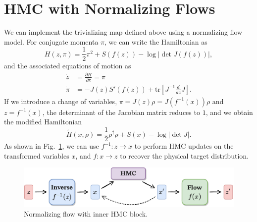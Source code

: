 \documentclass[a4paper,11pt]{article}
\begin{document}
\section{\label{sec:hmc_nf}HMC with Normalizing Flows}
%
We can implement the trivializing map defined above using a normalizing flow
model.
%
For conjugate momenta \(\pi\), we can write the Hamiltonian as
%
\begin{equation}
    H(z, \pi) = \frac{1}{2}\pi^{2} + S(f(z)) - \log\left|\det J(f(z))\right|,
\end{equation}
%
and the associated equations of motion as
%
\begin{align}
    \dot{z} &= \frac{\partial H}{\partial \pi} = \pi \\
    \dot{\pi} &= -J(z) S'(f(z)) + \mathrm{tr}\left[ J^{-1}\frac{d}{dz} J \right].
\end{align}
%
If we introduce a change of variables, \(\pi = J(z)\rho = J(f^{-1}(x))\rho\)
and \(z = f^{-1}(x)\), the determinant of the Jacobian matrix reduces to \(1\),
and we obtain the modified Hamiltonian
%
\begin{equation}
    \tilde{H}(x, \rho) = \frac{1}{2}\rho^{\dagger}\rho + S(x) - \log|\det J|.
\end{equation}
%
As shown in Fig.~\ref{fig:fthmc}, we can use \(f^{-1}: z \rightarrow x\) to
perform HMC updates on the transformed variables \(x\), and \(f: x \rightarrow
z\) to recover the physical target distribution.
%
\begin{figure}[htpb]
    \centering
    \includegraphics[width=\textwidth]{assets/fthmc.pdf}
    \caption{\label{fig:fthmc}Normalizing flow with inner HMC block.}
\end{figure}
%
\end{document}
